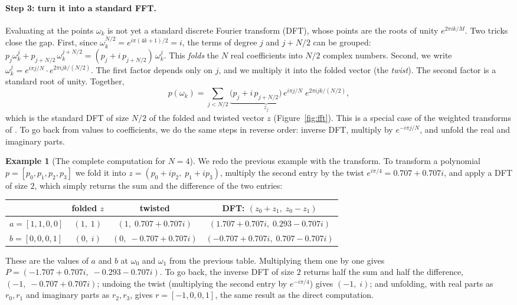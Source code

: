 \documentclass[12pt]{article}
\theoremstyle{plain}
\theoremstyle{definition}
\newtheorem{example}{Example}
\begin{document}
\paragraph{Step 3: turn it into a standard FFT.}
Evaluating at the points $\omega_k$ is not yet a standard discrete Fourier
transform (DFT), whose points are the roots of unity $e^{2\pi ik/M}$. Two tricks
close the gap. First, since $\omega_k^{N/2}=e^{i\pi(4k+1)/2}=i$, the terms of
degree $j$ and $j+N/2$ can be grouped:
$p_j\omega_k^j+p_{j+N/2}\,\omega_k^{j+N/2}=(p_j+i\,p_{j+N/2})\,\omega_k^j$. This
\emph{folds} the $N$ real coefficients into $N/2$ complex numbers. Second, we
write $\omega_k^j=e^{i\pi j/N}\cdot e^{2\pi ijk/(N/2)}$. The first factor depends
only on $j$, and we multiply it into the folded vector (the \emph{twist}). The
second factor is a standard root of unity. Together,
\[
  p(\omega_k)=\sum_{j<N/2}\underbrace{\big(p_j+i\,p_{j+N/2}\big)\,e^{i\pi j/N}}_{z_j}
  \;e^{2\pi i jk/(N/2)},
\]
which is the standard DFT of size $N/2$ of the folded and twisted vector $z$
(Figure~\ref{fig:fft}). This is a special case of the weighted transforms of
\cite{crandall1994dwt}. To go back from values to coefficients, we do the same
steps in reverse order: inverse DFT, multiply by $e^{-i\pi j/N}$, and unfold the
real and imaginary parts.



\begin{example}[The complete computation for $N=4$]
We redo the previous example with the transform. To transform a polynomial
$p=[p_0,p_1,p_2,p_3]$ we fold it into $z=(p_0+ip_2,\;p_1+ip_3)$, multiply the
second entry by the twist $e^{i\pi/4}=0.707+0.707i$, and apply a DFT of size $2$,
which simply returns the sum and the difference of the two entries:
\begin{center}
\small
\begin{tabular}{@{}lccc@{}}
\toprule
 & folded $z$ & twisted & DFT: $(z_0+z_1,\;z_0-z_1)$\\
\midrule
$a=[1,1,0,0]$ & $(1,\;1)$ & $(1,\;0.707+0.707i)$ & $(1.707+0.707i,\;0.293-0.707i)$\\
$b=[0,0,0,1]$ & $(0,\;i)$ & $(0,\;-0.707+0.707i)$ & $(-0.707+0.707i,\;0.707-0.707i)$\\
\bottomrule
\end{tabular}
\end{center}
These are the values of $a$ and $b$ at $\omega_0$ and $\omega_1$ from the
previous table. Multiplying them one by one gives
$P=(-1.707+0.707i,\;-0.293-0.707i)$. To go back, the inverse DFT of size $2$
returns half the sum and half the difference, $(-1,\;-0.707+0.707i)$; undoing
the twist (multiplying the second entry by $e^{-i\pi/4}$) gives $(-1,\;i)$; and
unfolding, with real parts as $r_0,r_1$ and imaginary parts as $r_2,r_3$, gives
$r=[-1,0,0,1]$, the same result as the direct computation.
\end{example}
\end{document}

